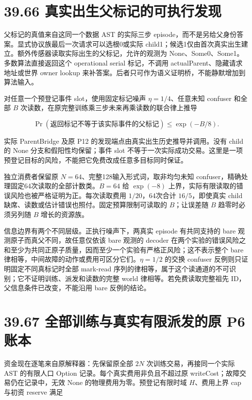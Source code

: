 \documentclass[
  11pt,
  oneside]{book}
\begin{document}
\section{39.66 真实出生父标记的可执行发现}\label{ux771fux5b9eux51faux751fux7236ux6807ux8bb0ux7684ux53efux6267ux884cux53d1ux73b0}

父标记的真值来自这同一个数据 AST 的实际三步 episode，而不是另给父身份答案。显式协议族最后一次请求可以选根0或实际 child1；候选1仅由首次真实出生建立。额外传感器读取实际出生的父标记，允许的观测为 None、Some0、Some1。多数算法直接返回这个 operational serial 标记，不调用 actualParent、隐藏请求地址或世界 owner lookup 来补答案。后者只可作为语义证明桥，不能静默增加到算法输入。

对任意一个预登记事件 slot，使用固定标记噪声 \(\eta=1/4\)、任意未知 confuser 和全部 \(B\) 次读数，在原完整训练乘三步未来再乘读数的联合律上推导

\[\Pr(\text{返回标记不等于该实际事件的父标记})
\le \exp(-B/8).\]

实际 ParentBridge 及原 P12 的发现端点由真实出生历史推导并调用。没有 child 的 None 分支和假阳性均保留；事件 slot 不等于一次实际成功交易。这里是一项预登记目标的风险，不能把它免费改成任意多目标同时保证。

独立消费者保留原 \(N=64\)、完整128输入形式词，取非均匀未知 confuser，精确处理固定64次读取的全部计数类。\(B=64\) 给 \(\exp(-8)\) 上界，实际有限读取的错误风险也被严格证明为正。每次读取费用 \(1/20\)，64次合计 \(16/5\)，即使真实 child 缺席、读数或估计错误也照付。固定预算限制可读取的 \(B\)；让误差随 \(B\) 趋零时必须另列随 \(B\) 增长的资源族。

信息边界有两个不同层级。正执行噪声下，两真实 episode 有共同支持的 bare 观测原子而真父不同，故任意仅依该 bare 观测的 decoder 在两个实验的错误风险之和至少为共同正原子质量，因而至少一个实验有严格正风险；这不表示整个 bare 律相等，中间故障的动作或费用可区分它们。\(\eta=1/2\) 的交换 confuser 反例则只证明固定不同真标记时全部 mark-read 序列的律相等，属于这个读通道的不可识别；它不证明训练、派发和读数的完整 world 律相等。若免费读取完整祖先 ID，父信息条件已改变，不能沿用 bare 反例的结论。

\section{39.67 全部训练与真实有限派发的原 P6 账本}\label{ux5168ux90e8ux8badux7ec3ux4e0eux771fux5b9eux6709ux9650ux6d3eux53d1ux7684ux539f-p6-ux8d26ux672c}

资金现在逐笔来自原解释器：先保留原全部 \(2N\) 次训练交易，再接同一个实际 AST 的有限人口 Option 记录。每个真实费用非负且不超过原 writeCost；故障交易仍在记录中，无效 None 的物理费用为零。预登记有限时域 \(H\)、费用上界 cap 与初资 reserve 满足
\end{document}

